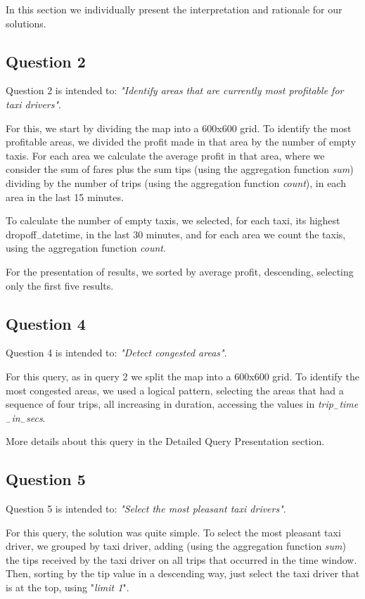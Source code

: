 In this section we individually present the interpretation and rationale for our solutions.

\subsection{Question 2}

Question 2 is intended to: \textit{"Identify areas that are currently most profitable for taxi drivers"}.\par
For this, we start by dividing the map into a 600x600 grid. To identify the most profitable areas, we divided the profit made in that area by the number of empty taxis.
For each area we calculate the average profit in that area, where we consider the sum of fares plus the sum tips (using the aggregation function \textit{sum}) dividing by the number of trips (using the aggregation function \textit{count}), in each area in the last 15 minutes.\par
To calculate the number of empty taxis, we selected, for each taxi, its highest dropoff$_-$datetime, in the last 30 minutes, and for each area we count the taxis, using the aggregation function \textit{count}.\par
For the presentation of results, we sorted by average profit, descending, selecting only the first five results. 

\subsection{Question 4}

Question 4 is intended to: \textit{"Detect congested areas"}.\par
For this query, as in query 2 we split the map into a 600x600 grid. To identify the most congested areas, we used a logical pattern, selecting the areas that had a sequence of four trips, all increasing in duration, accessing the values in \textit{trip$_-$time$_-$in$_-$secs}.\par
More details about this query in the Detailed Query Presentation section. 

\subsection{Question 5}

Question 5 is intended to: \textit{"Select the most pleasant taxi drivers"}.\par
For this query, the solution was quite simple. To select the most pleasant taxi driver, we grouped by taxi driver, adding (using the aggregation function \textit{sum}) the tips received by the taxi driver on all trips that occurred in the time window. Then, sorting by the tip value in a descending way, just select the taxi driver that is at the top, using "\textit{limit 1}". 

